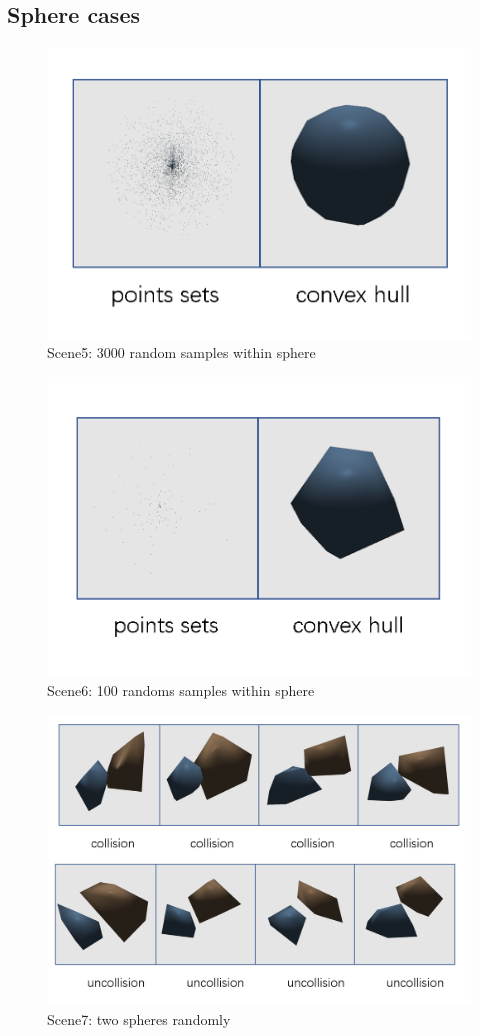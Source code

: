 \documentclass[acmtog]{acmart}
\begin{document}
\subsection{Sphere cases}


\begin{figure}[htbp]
	\centering
	\includegraphics[scale=0.2]{scene5.png}
	\caption{Scene5: 3000 random samples within sphere}
	\label{fig:5}
\end{figure}

\begin{figure}[htbp]
	\centering
	\includegraphics[scale=0.2]{scene6.png}
	\caption{Scene6: 100 randoms samples within sphere}
	\label{fig:6}
\end{figure}

\begin{figure}[htbp]
	\centering
	\includegraphics[scale=0.15]{scene7.png}
	\caption{Scene7: two spheres randomly}
	\label{fig:7}
\end{figure}
\end{document}
